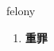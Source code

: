 
\begin{frame}
{\huge felony}
\begin{center}
\begin{enumerate}\Large
  \item \textbf{重罪}
\end{enumerate}
\end{center}
\end{frame}
